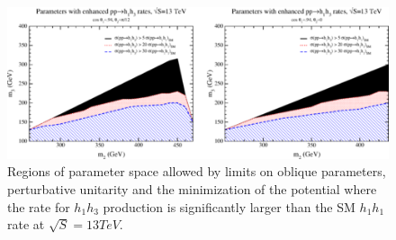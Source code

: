 \begin{figure}[h]
\begin{center}
\includegraphics[scale=0.65]{figures/CompHiggsSing_Fig6}
\caption[Allowed regions of parameter space with enhanced di-Higgs production]{Regions of parameter space allowed by limits on oblique parameters, perturbative unitarity and the minimization of the potential where the rate for ${h_{1}h_{3}}$ production is significantly larger than the SM ${h_{1}h_{1}}$ rate at ${\sqrt{S} = 13 TeV}$.}
\label{fig:CSH6}
\end{center}
\end{figure}


